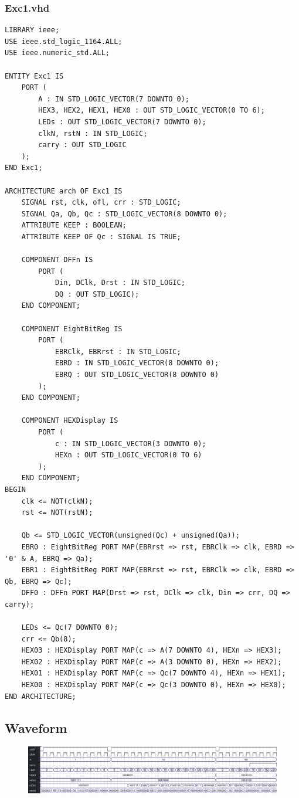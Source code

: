 \documentclass[13pt,a4paper]{report}
\begin{document}
\subsubsection{Exc1.vhd}
\begin{verbatim}
LIBRARY ieee;
USE ieee.std_logic_1164.ALL;
USE ieee.numeric_std.ALL;

ENTITY Exc1 IS
	PORT (
		A : IN STD_LOGIC_VECTOR(7 DOWNTO 0);
		HEX3, HEX2, HEX1, HEX0 : OUT STD_LOGIC_VECTOR(0 TO 6);
		LEDs : OUT STD_LOGIC_VECTOR(7 DOWNTO 0);
		clkN, rstN : IN STD_LOGIC;
		carry : OUT STD_LOGIC
	);
END Exc1;

ARCHITECTURE arch OF Exc1 IS
	SIGNAL rst, clk, ofl, crr : STD_LOGIC;
	SIGNAL Qa, Qb, Qc : STD_LOGIC_VECTOR(8 DOWNTO 0);
	ATTRIBUTE KEEP : BOOLEAN;
	ATTRIBUTE KEEP OF Qc : SIGNAL IS TRUE;

	COMPONENT DFFn IS
		PORT (
			Din, DClk, Drst : IN STD_LOGIC;
			DQ : OUT STD_LOGIC);
	END COMPONENT;

	COMPONENT EightBitReg IS
		PORT (
			EBRClk, EBRrst : IN STD_LOGIC;
			EBRD : IN STD_LOGIC_VECTOR(8 DOWNTO 0);
			EBRQ : OUT STD_LOGIC_VECTOR(8 DOWNTO 0)
		);
	END COMPONENT;

	COMPONENT HEXDisplay IS
		PORT (
			c : IN STD_LOGIC_VECTOR(3 DOWNTO 0);
			HEXn : OUT STD_LOGIC_VECTOR(0 TO 6)
		);
	END COMPONENT;
BEGIN
	clk <= NOT(clkN);
	rst <= NOT(rstN);

	Qb <= STD_LOGIC_VECTOR(unsigned(Qc) + unsigned(Qa));
	EBR0 : EightBitReg PORT MAP(EBRrst => rst, EBRClk => clk, EBRD => '0' & A, EBRQ => Qa);
	EBR1 : EightBitReg PORT MAP(EBRrst => rst, EBRClk => clk, EBRD => Qb, EBRQ => Qc);
	DFF0 : DFFn PORT MAP(Drst => rst, DClk => clk, Din => crr, DQ => carry);

	LEDs <= Qc(7 DOWNTO 0);
	crr <= Qb(8);
	HEX03 : HEXDisplay PORT MAP(c => A(7 DOWNTO 4), HEXn => HEX3);
	HEX02 : HEXDisplay PORT MAP(c => A(3 DOWNTO 0), HEXn => HEX2);
	HEX01 : HEXDisplay PORT MAP(c => Qc(7 DOWNTO 4), HEXn => HEX1);
	HEX00 : HEXDisplay PORT MAP(c => Qc(3 DOWNTO 0), HEXn => HEX0);
END ARCHITECTURE;
\end{verbatim}

\subsection{Waveform}
\begin{figure}[H]
\centering
\includegraphics[scale=0.5]{images/Exc1_waveform.png}
\end{figure}
\end{document}
